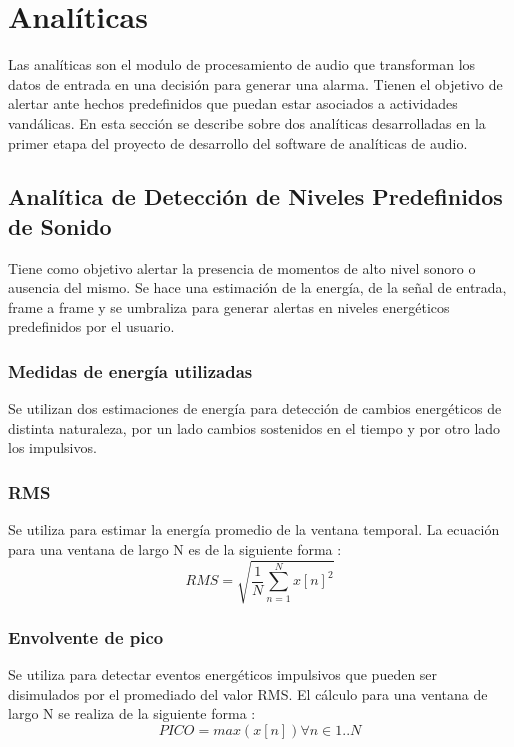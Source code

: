 \documentclass{article}
\begin{document}

\section{Analíticas}
\label{analiticas}
Las analíticas son el modulo de procesamiento de audio que transforman los datos de entrada en una decisión para generar una alarma. Tienen el objetivo de alertar ante hechos predefinidos que puedan estar asociados a actividades vandálicas. En esta sección se describe sobre dos analíticas desarrolladas en la primer etapa del proyecto de desarrollo del software de analíticas de audio. 

\subsection{Analítica de Detección de Niveles Predefinidos de Sonido}
Tiene como objetivo alertar la presencia de momentos de alto nivel sonoro o ausencia del mismo. Se hace una estimación de la energía, de la señal de entrada, frame a frame y se umbraliza para generar alertas en niveles energéticos predefinidos por el usuario.

\subsubsection{Medidas de energía utilizadas}
Se utilizan dos estimaciones de energía para detección de cambios energéticos de distinta naturaleza, por un lado cambios sostenidos en el tiempo y por otro lado los impulsivos.

\subsubsection*{RMS}
Se utiliza para estimar la energía promedio de la ventana temporal. La ecuación para una ventana de largo N es de la siguiente forma \cite[Chapter~4]{Lerch:2012:IAC:2392638}:
\begin{equation}
RMS = \sqrt{\frac{1}{N}\sum_{n=1}^{N} x[n]^2}
\end{equation}

\subsubsection*{Envolvente de pico}
Se utiliza para detectar eventos energéticos impulsivos que pueden ser disimulados por el promediado del valor RMS. El cálculo para una ventana de largo N se realiza de la siguiente forma \cite[Chapter~4]{Lerch:2012:IAC:2392638}:
\begin{equation}
PICO = max(x[n])\forall n \in 1..N 
\end{equation}
\end{document}
